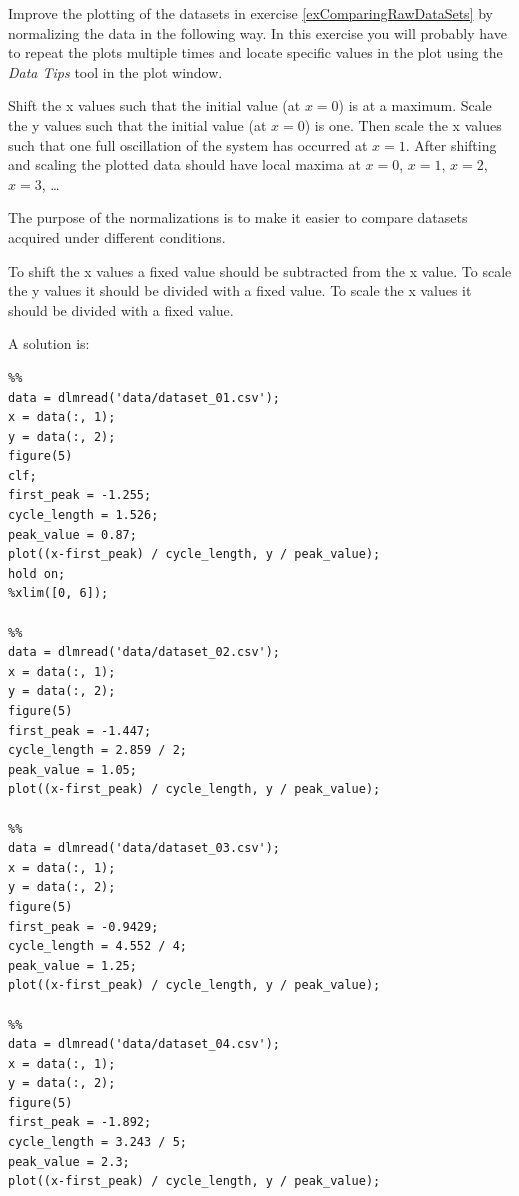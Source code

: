 \begin{ex}
Improve the plotting of the datasets in exercise 
\ref{exComparingRawDataSets} by normalizing the data
in the following way.
In this exercise you will probably have to repeat the plots 
multiple times and locate specific values in the plot using the
\emph{Data Tips} tool in the plot window.

Shift the x values such that the initial value (at $x = 0$) is
at a maximum.
Scale the y values such that the initial value (at $x = 0$) is one.
Then scale the x values such that one full oscillation of the
system has occurred at $x = 1$.
After shifting and scaling the plotted data should 
have local maxima at $x = 0$, $x = 1$, $x = 2$, $x = 3$, \ldots

The purpose of the normalizations is to make it easier to 
compare datasets acquired under different conditions.
\begin{hint}
To shift the x values a fixed value should be subtracted from the x 
value.
To scale the y values it should be divided with a fixed value.
To scale the x values it should be divided with a fixed value.
\end{hint}
\begin{sol}
A solution is:
\begin{lstlisting}
%%
data = dlmread('data/dataset_01.csv');
x = data(:, 1);
y = data(:, 2);
figure(5)
clf;
first_peak = -1.255;
cycle_length = 1.526;
peak_value = 0.87;
plot((x-first_peak) / cycle_length, y / peak_value);
hold on;
%xlim([0, 6]);

%%
data = dlmread('data/dataset_02.csv');
x = data(:, 1);
y = data(:, 2);
figure(5)
first_peak = -1.447;
cycle_length = 2.859 / 2;
peak_value = 1.05;
plot((x-first_peak) / cycle_length, y / peak_value);

%%
data = dlmread('data/dataset_03.csv');
x = data(:, 1);
y = data(:, 2);
figure(5)
first_peak = -0.9429;
cycle_length = 4.552 / 4;
peak_value = 1.25;
plot((x-first_peak) / cycle_length, y / peak_value);

%%
data = dlmread('data/dataset_04.csv');
x = data(:, 1);
y = data(:, 2);
figure(5)
first_peak = -1.892;
cycle_length = 3.243 / 5;
peak_value = 2.3;
plot((x-first_peak) / cycle_length, y / peak_value);
\end{lstlisting}
\end{sol}
\end{ex}



